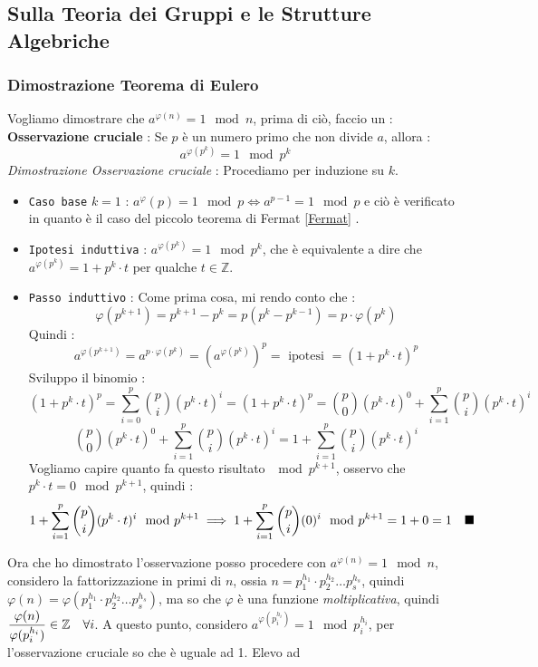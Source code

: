 \documentclass[12pt, letterpaper]{article}
\newcommand{\code}[1]{\colorbox{light-gray}{\texttt{#1}}}
\newcommand{\Z}{{\mathbb Z}}
\newcommand{\spaz}{{\text{\hphantom{aa}}}}
\begin{document}
\subsection{Sulla Teoria dei Gruppi e le Strutture Algebriche}
\subsubsection{Dimostrazione Teorema di Eulero} \label{dimTeoEulero} 
Vogliamo dimostrare che \(a^{\varphi(n)}=1 \mod n\), prima di ciò, faccio un :\\
\textbf{Osservazione cruciale} : Se \(p\) è un numero primo che non divide \(a\), allora : 
$$a^{\varphi(p^k)}=1 \mod p^k$$
\textit{Dimostrazione Osservazione cruciale} : Procediamo per induzione su \(k\).\begin{itemize}
    \item  \code{Caso base} \(k=1\) : \(a^\varphi(p)=1 \mod p\iff a^{p-1}=1\mod p\) e ciò è verificato in quanto è il caso del piccolo 
    teorema di Fermat \ref{Fermat} .
    \item \code{Ipotesi induttiva} : \(a^{\varphi(p^k)}=1 \mod p^k\), che è equivalente a dire che  \(a^{\varphi(p^k)}=1+p^k\cdot t\) per qualche \(t\in\Z\).
    \item\code{Passo induttivo} : Come prima cosa, mi rendo conto che : 
    $$\varphi(p^{k+1})=p^{k+1}-p^k=p(p^k-p^{k-1})=p\cdot\varphi(p^k)$$
    Quindi : 
    $$a^{\varphi(p^{k+1})}=a^{p\cdot\varphi(p^k)}=(a^{\varphi(p^k)})^p=\text{ ipotesi }=(1+p^k\cdot t)^p$$
    Sviluppo il binomio : 
    $$(1+p^k\cdot t)^p=\sum_{i=0}^p\binom{p}{i}(p^k\cdot t)^i=(1+p^k\cdot t)^p=\binom{p}{0}(p^k\cdot t)^0+\sum_{i=1}^p\binom{p}{i}(p^k\cdot t)^i$$
    $$\binom{p}{0}(p^k\cdot t)^0+\sum_{i=1}^p\binom{p}{i}(p^k\cdot t)^i=1+\sum_{i=1}^p\binom{p}{i}(p^k\cdot t)^i$$
    Vogliamo capire quanto fa questo risultato \(\mod p^{k+1}\), osservo che \(p^k\cdot t =0 \mod p^{k+1}\), quindi : 
    $$1+\sum_{i=1}^p\binom{p}{i}(p^k\cdot t)^i\mod p^{k+1}\implies 1+\sum_{i=1}^p\binom{p}{i}(0)^i\mod p^{k+1}=1+0=1 \spaz \blacksquare$$
\end{itemize}
 Ora che ho dimostrato l'osservazione posso procedere con \(a^{\varphi(n)}=1 \mod n\), considero la fattorizzazione in primi 
 di \(n\), ossia \(n=p_1^{h_1}\cdot p_2^{h_2}\dots p_s^{h_s}\), quindi \(\varphi(n)=\varphi(p_1^{h_1}\cdot p_2^{h_2}\dots p_s^{h_s})\), 
 ma so che \(\varphi\) è una funzione \textit{moltiplicativa}, quindi \(\dfrac{\varphi(n)}{\varphi(p_i^{h_i})}\in \Z\spaz \forall i\).
A questo punto, considero \(a^{\varphi(p_i^{h_i})}=1\mod p_i^{h_i}\), per l'osservazione cruciale so che è uguale ad 1. Elevo ad 
\end{document}
